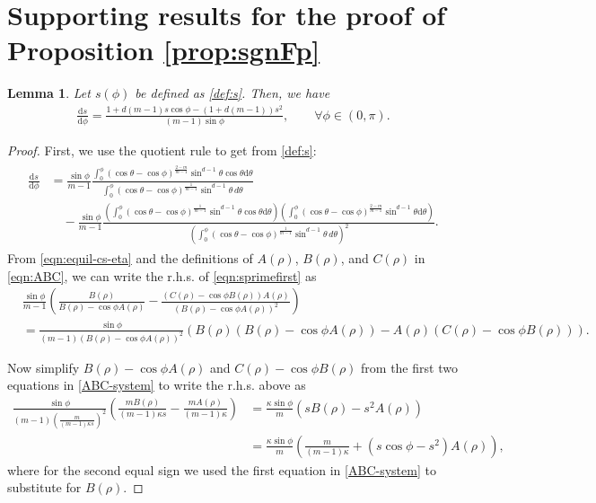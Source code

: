 \documentclass[11pt]{amsart}
\newtheorem{lemma}{Lemma}[section]
\def\d{\mathrm{d}}
\newcommand{\dm}{d} %
\begin{document}
\section{Supporting results for the proof of Proposition \ref{prop:sgnFp}}
\label{appendix:signG}
\begin{lemma}
\label{appendix:lemma1}
Let $s(\phi)$ be defined as \eqref{def:s}. Then, we have
\begin{align}\label{eqn:sprime}
\frac{\d s}{\d\phi}=\frac{1+\dm(m-1)s \cos\phi -(1+\dm(m-1))s^2}{(m-1)\sin\phi},\qquad\forall \phi\in(0, \pi).
\end{align}
\end{lemma}
\begin{proof}
First, we use the quotient rule to get from \eqref{def:s}:
\begin{align}
\begin{aligned}\label{eqn:sprimefirst}
\frac{\d s}{\d\phi}&=\frac{\sin\phi}{m-1}\frac{\int_0^\phi(\cos\theta-\cos\phi)^{\frac{2-m}{m-1}}\sin^{\dm-1}\theta\cos\theta\d\theta}{\int_0^\phi
(\cos\theta-\cos\phi)^{\frac{1}{m-1}}
\sin^{d-1}\theta\,d\theta}\\
&\quad -\frac{\sin\phi}{m-1}\frac{\left(\int_0^\phi(\cos\theta-\cos\phi)^{\frac{1}{m-1}}\sin^{\dm-1}\theta\cos\theta\d\theta\right)\left(\int_0^\phi(\cos\theta-\cos\phi)^{\frac{2-m}{m-1}}\sin^{\dm-1}\theta\d\theta\right)}{\left(\int_0^\phi
(\cos\theta-\cos\phi)^{\frac{1}{m-1}}
\sin^{d-1}\theta\,d\theta\right)^2}.
\end{aligned}
\end{align}
From \eqref{eqn:equil-cs-eta} and the definitions of $A(\rho)$, $B(\rho)$, and $C(\rho)$ in \eqref{eqn:ABC}, we can write the r.h.s. of \eqref{eqn:sprimefirst}
as
\begin{align*}
&\frac{\sin\phi}{m-1}\left(\frac{B(\rho)}{B(\rho)-\cos\phi A(\rho)}-\frac{(C(\rho)-\cos\phi B(\rho))A(\rho)}{(B(\rho)-\cos\phi A(\rho))^2}\right)\\
&=\frac{\sin\phi }{(m-1)(B(\rho)-\cos\phi A(\rho))^2}\left(
B(\rho)(B(\rho)-\cos\phi A(\rho))-A(\rho)(C(\rho)-\cos\phi B(\rho))
\right).
\end{align*}

Now simplify $B(\rho)-\cos\phi A(\rho)$ and $C(\rho)-\cos\phi B(\rho)$ from the first two equations in \eqref{ABC-system} to write the r.h.s. above as
\begin{align*}
\frac{\sin\phi }{(m-1)\left(\frac{m}{(m-1)\kappa s}\right)^2}\left(
\frac{m B(\rho)}{(m-1)\kappa s}-\frac{m A(\rho)}{(m-1)\kappa}
\right)&=\frac{\kappa\sin\phi }{m}(sB(\rho)-s^2 A(\rho)) \\
&=\frac{\kappa \sin\phi}{m}\left(\frac{m}{(m-1)\kappa}+(s\cos\phi-s^2)A(\rho)\right),
\end{align*}
where for the second equal sign we used the first equation in \eqref{ABC-system} to substitute for $B(\rho)$.


\end{proof}
\end{document}
